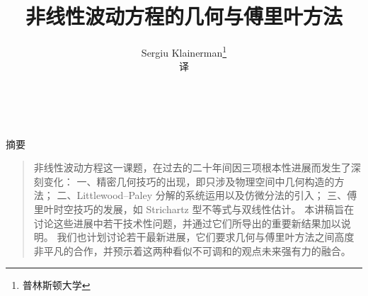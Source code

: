 \documentclass[Biblatex=false]{mathtranslation}
\title{非线性波动方程的几何与傅里叶方法}
\author{Sergiu Klainerman\thanks{普林斯顿大学}\\[4pt] \small 译}
\date{}
\makeatletter
\theoremstyle{mtfang}
\theoremstyle{mtsong}
\theoremstyle{mtfang}
\theoremstyle{mtsong}
\renewcommand{\maketitle}{%
  \begin{center}
    {\LARGE\headfont \@title}\\[1.6em]
    {\large \@author}%
  \end{center}%
  \vspace{1.2em}%
  \@thanks
}
\newenvironment{abstract}{%
  \par\medskip
  \begin{center}{\headfont 摘\quad 要}\end{center}%
  \begin{quote}\small\noindent
}{%
  \end{quote}\medskip
}
\makeatother
\begin{document}
\frontmatter
\maketitle

\begin{abstract}
非线性波动方程这一课题，在过去的二十年间因三项根本性进展而发生了深刻变化：
一、精密几何技巧的出现，即只涉及物理空间中几何构造的方法；
二、Littlewood--Paley 分解的系统运用以及仿微分法的引入；
三、傅里叶时空技巧的发展，如 Strichartz 型不等式与双线性估计。
本讲稿旨在讨论这些进展中若干技术性问题，并通过它们所导出的重要新结果加以说明。
我们也计划讨论若干最新进展，它们要求几何与傅里叶方法之间高度非平凡的合作，并预示着这两种看似不可调和的观点未来强有力的融合。
\end{abstract}

\newpage
\begingroup
\pagestyle{empty}
\tableofcontents
\clearpage
\endgroup

\mainmatter








\end{document}
